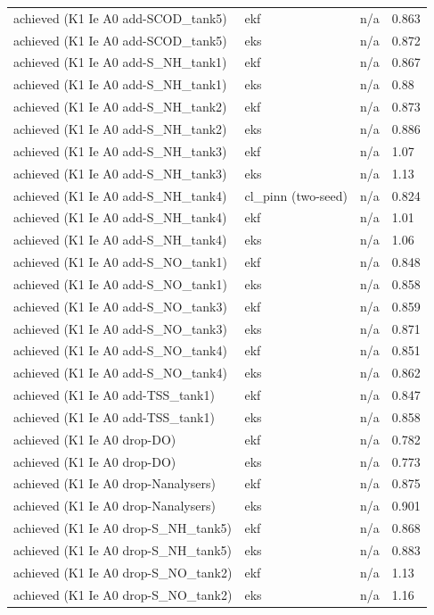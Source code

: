 \begin{table}[t]
\begin{tabular}{llll}
achieved (K1 Ie A0 add-SCOD\_tank5) & ekf & n/a & 0.863 \\
achieved (K1 Ie A0 add-SCOD\_tank5) & eks & n/a & 0.872 \\
achieved (K1 Ie A0 add-S\_NH\_tank1) & ekf & n/a & 0.867 \\
achieved (K1 Ie A0 add-S\_NH\_tank1) & eks & n/a & 0.88 \\
achieved (K1 Ie A0 add-S\_NH\_tank2) & ekf & n/a & 0.873 \\
achieved (K1 Ie A0 add-S\_NH\_tank2) & eks & n/a & 0.886 \\
achieved (K1 Ie A0 add-S\_NH\_tank3) & ekf & n/a & 1.07 \\
achieved (K1 Ie A0 add-S\_NH\_tank3) & eks & n/a & 1.13 \\
achieved (K1 Ie A0 add-S\_NH\_tank4) & cl\_pinn (two-seed) & n/a & 0.824 \\
achieved (K1 Ie A0 add-S\_NH\_tank4) & ekf & n/a & 1.01 \\
achieved (K1 Ie A0 add-S\_NH\_tank4) & eks & n/a & 1.06 \\
achieved (K1 Ie A0 add-S\_NO\_tank1) & ekf & n/a & 0.848 \\
achieved (K1 Ie A0 add-S\_NO\_tank1) & eks & n/a & 0.858 \\
achieved (K1 Ie A0 add-S\_NO\_tank3) & ekf & n/a & 0.859 \\
achieved (K1 Ie A0 add-S\_NO\_tank3) & eks & n/a & 0.871 \\
achieved (K1 Ie A0 add-S\_NO\_tank4) & ekf & n/a & 0.851 \\
achieved (K1 Ie A0 add-S\_NO\_tank4) & eks & n/a & 0.862 \\
achieved (K1 Ie A0 add-TSS\_tank1) & ekf & n/a & 0.847 \\
achieved (K1 Ie A0 add-TSS\_tank1) & eks & n/a & 0.858 \\
achieved (K1 Ie A0 drop-DO) & ekf & n/a & 0.782 \\
achieved (K1 Ie A0 drop-DO) & eks & n/a & 0.773 \\
achieved (K1 Ie A0 drop-Nanalysers) & ekf & n/a & 0.875 \\
achieved (K1 Ie A0 drop-Nanalysers) & eks & n/a & 0.901 \\
achieved (K1 Ie A0 drop-S\_NH\_tank5) & ekf & n/a & 0.868 \\
achieved (K1 Ie A0 drop-S\_NH\_tank5) & eks & n/a & 0.883 \\
achieved (K1 Ie A0 drop-S\_NO\_tank2) & ekf & n/a & 1.13 \\
achieved (K1 Ie A0 drop-S\_NO\_tank2) & eks & n/a & 1.16 \\

\end{tabular}
\end{table}
